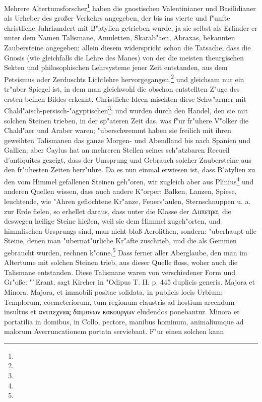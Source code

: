 \documentclass[a4paper, 11pt, oneside, polutonikogreek, german]{article}
\begin{document}
Mehrere Altertumsforscher\footnote{} haben die gnostischen Valentinianer und Basilidianer als Urheber des großer Verkehrs angegeben, der bis ins vierte und f"unfte christliche Jahrhundert mit B"atylien getrieben wurde, ja sie selbst als Erfinder er unter dem Namen Talismane, Amuletten, Skarab"aen, Abraxas, bekannten Zaubersteine angegeben; allein diesem widerspricht schon die Tatsache; dass die Gnosis (wie gleichfalls die Lehre des Manes) von der die meisten theurgischen Sekten und philosophischen Lehrsysteme jener Zeit entstanden, aus dem Petsismus oder Zerduschts Lichtlehre hervorgegangen,\footnote{} und gleichsam nur ein tr"uber Spiegel ist, in dem man gleichwohl die obschon entstellten Z"uge des ersten beinen Bildes erkennt. Christliche Ideen mischten diese Schw"armer mit Chald"aisch-persisch-"agyptischen\footnote{}; und wurden durch den Handel, den sie mit solchen Steinen trieben, in der sp"ateren Zeit das, was f"ur fr"uhere V"olker die Chald"aer und Araber waren; "uberschwemmt haben sie freilich mit ihren geweihten Talismanen das ganze Morgen- und Abendland bis nach Spanien und Gallien; aber Caylus hat an mehreren Stellen seines sch"atzbaren Recueil d'antiquites gezeigt, dass der Umsprung und Gebrauch solcher Zaubersteine aus den fr"uhesten Zeiten herr"uhre. Da es nun einmal erwiesen ist, dass B"atylien zu den vom Himmel gefallenen Steinen geh"oren, wir zugleich aber aus Plinius\footnote{} und anderen Quellen wissen, dass auch andere K"orper: Balken, Lanzen, Spiese, leuchtende, wie "Ahren geflochtene Kr"anze, Feuers"aulen, Sternschnuppen u. a. zur Erde fielen, so erhellet daraus, dass unter die Klasse der Διιπετρα, die deswegen heilige Steine hießen, weil sie dem Himmel zugeh"orten, und himmlischen Ursprungs sind, man nicht bloß Aerolithen, sondern: "uberhaupt alle Steine, denen man "ubernat"urliche Kr"afte zuschrieb, und die als Gemmen gebraucht wurden, rechnen k"onne.\footnote{} Dass ferner aller Aberglaube, den man im Altertume mit solchen Steinen trieb, aus dieser Quelle floss, woher auch die Talismane entstanden. Diese Talismane waren von verschiedener Form und Gr"oße: "`Erant, sagt Kircher in "Odipus T. II. p. 445 duplicis generis. Majora et Minora. Majora, et immobili positae solidata, in publicis locis Urbium; Templorum, coemeteriorum, tum regionum claustris ad hostium arcendum insultus et αντιτεχνιας δαιμονων κακουργων eludendos ponebantur. Minora et portatilia in domibus, in Collo, pectore, manibus hominum, animaliumque ad malorum Averruncationem portata serviebant. F"ur einen solchen kann 
\end{document}
